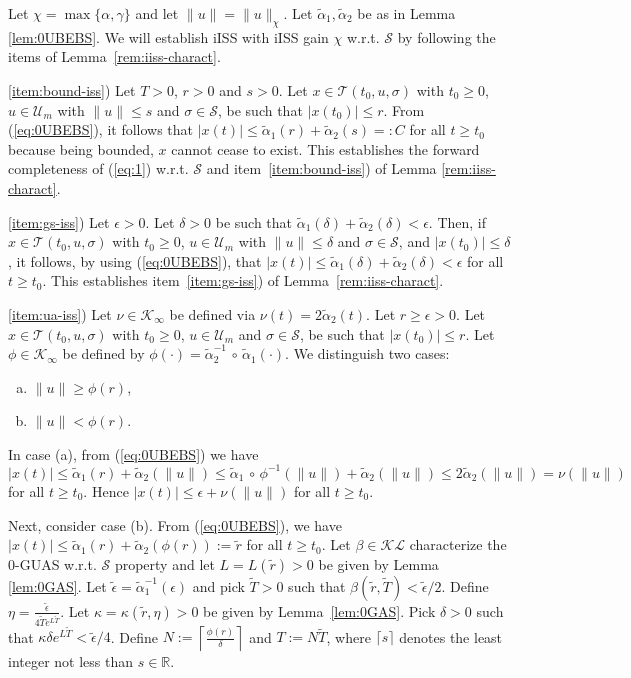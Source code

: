 \documentclass[9pt,final,journal]{IEEEtran}
\def\K{\mathcal{K}}
\def\Ki{\K_{\infty}}
\def\KL{\mathcal{KL}}
\def\R{\mathbb{R}}
\def\S{\mathcal{S}}
\def\T{\mathcal{T}}
\def\U{\mathcal{U}}
\def\comp{{\scriptstyle\,\circ}\,}
\begin{document}
\begin{IEEEproof}
% 
Let $\chi=\max\{\alpha,\gamma\}$ and let $\|u\|= \|u\|_{\chi}$. Let $\tilde\alpha_1, \tilde\alpha_2$ be as in Lemma \ref{lem:0UBEBS}.  We will establish iISS with iISS gain $\chi$ w.r.t. $\S$ by following the items of Lemma~\ref{rem:iiss-charact}.

\ref{item:bound-iss}) Let $T>0$, $r>0$ and $s>0$. Let $x \in \T(t_0,u,\sigma)$ with $t_0\ge 0$, $u\in \U_m$ with $\|u\| \le s$ and $\sigma\in\S$, be such that $|x(t_0)|\le r$. From (\ref{eq:0UBEBS}), it follows that $|x(t)| \le \tilde \alpha_1(r)+\tilde \alpha_2(s) =: C$ for all $t\ge t_0$ because being bounded, $x$ cannot cease to exist. This establishes the forward completeness of (\ref{eq:1}) w.r.t. $\S$ and item~\ref{item:bound-iss}) of Lemma \ref{rem:iiss-charact}.

\ref{item:gs-iss}) Let $\epsilon > 0$. Let $\delta>0$ be such that $\tilde \alpha_1(\delta)+\tilde \alpha_2(\delta)<\epsilon$. Then, if $x \in \T(t_0,u,\sigma)$ with $t_0\ge 0$, $u\in \U_m$ with $\|u\| \le \delta$ and $\sigma\in\S$, and $|x(t_0)|\le \delta$, it follows, by using (\ref{eq:0UBEBS}), that $|x(t)|\le \tilde \alpha _1(\delta)+\tilde \alpha_2(\delta)<\epsilon$ for all $t\ge t_0$. This establishes item~\ref{item:gs-iss}) of Lemma~\ref{rem:iiss-charact}.

\ref{item:ua-iss}) Let $\nu\in\Ki$ be defined via $\nu(t) = 2 \tilde \alpha_2(t)$. Let $r\ge\epsilon>0$.  Let $x \in \T(t_0,u,\sigma)$ with $t_0\ge 0$, $u\in \U_m$ and $\sigma\in\S$, be such that $|x(t_0)| \le r$. Let $\phi\in\Ki$ be defined by $\phi(\cdot)=\tilde \alpha_2^{-1}\comp \tilde \alpha_1(\cdot)$. We distinguish two cases:
\begin{enumerate}[(a)]
\item $\|u\| \ge \phi(r)$,
\item $\|u\| < \phi(r)$.
\end{enumerate}
%
In case (a), from (\ref{eq:0UBEBS}) we have $|x(t)| \le \tilde \alpha_1(r) +\tilde\alpha_2(\|u\|) \le \tilde \alpha_1\comp\phi^{-1}(\|u\|) +\tilde\alpha_2(\|u\|) \le 2 \tilde \alpha_2(\|u\|)=\nu(\|u\|)$ for all $t\ge t_0$. Hence $|x(t)| \le \epsilon +\nu(\|u\|)$ for all $t\ge t_0$.

Next, consider case (b). From (\ref{eq:0UBEBS}), we have  $|x(t)|\le \tilde \alpha_1(r)+\tilde \alpha_2(\phi(r)):=\tilde r$
for all $t\ge t_0$. Let $\beta \in \KL$ characterize the 0-GUAS w.r.t. $\S$ property and let $L = L(\tilde r) > 0$ be given by Lemma \ref{lem:0GAS}. Let $\tilde \epsilon=\tilde \alpha_1^{-1}(\epsilon)$ and pick $\tilde T>0$ such that $\beta(\tilde r,\tilde T)< \tilde \epsilon/2$. Define $\eta=\frac{\tilde \epsilon}{4 \tilde T e^{L \tilde T}}$. Let $\kappa = \kappa(\tilde r,\eta) > 0$ be given by Lemma~\ref{lem:0GAS}. Pick $\delta>0$ such that $\kappa \delta e^{L \tilde T}< \tilde \epsilon/4$.  Define $N := \left\lceil \frac{\phi(r)}{\delta} \right\rceil$ and  $T:= N \tilde T$, where $\lceil s\rceil$ denotes the least integer not less than $s\in \R$.


\end{IEEEproof}
\end{document}
